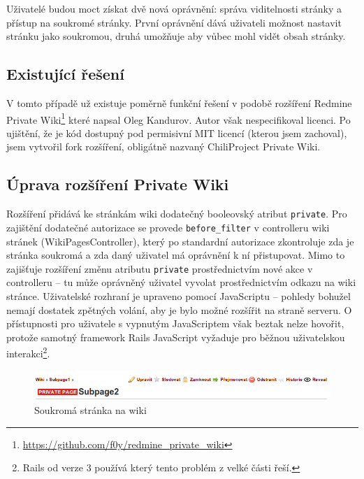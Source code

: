 \documentclass[thesis=B,czech]{FITthesis}[2012/05/02]
\begin{document}
Uživatelé budou moct získat dvě nová oprávnění: správa viditelnosti
stránky a přístup na soukromé stránky. První oprávnění dává uživateli
možnost nastavit stránku jako soukromou, druhá umožňuje aby vůbec mohl
vidět obsah stránky.

\subsection{Existující řešení}

V tomto případě už existuje poměrně funkční řešení v podobě rozšíření
Redmine Private Wiki\footnote{\url{https://github.com/f0y/redmine_private_wiki}}
které napsal Oleg Kandurov. Autor však nespecifikoval licenci. Po
ujištění, že je kód dostupný pod permisivní MIT licencí (kterou jsem
zachoval), jsem vytvořil \gls{fork} rozšíření, obligátně nazvaný
ChiliProject Private Wiki.

\subsection{Úprava rozšíření Private Wiki}

Rozšíření přidává ke stránkám wiki dodatečný booleovský atribut
\lstinline!private!. Pro zajištění dodatečné autorizace se provede
\lstinline!before_filter! v controlleru wiki stránek
(WikiPagesController), který po standardní autorizace zkontroluje zda je
stránka soukromá a zda daný uživatel má oprávnění k ní přistupovat. Mimo
to zajišťuje rozšíření změnu atributu \lstinline!private!
prostřednictvím nové akce v controlleru -- tu může oprávněný uživatel
vyvolat prostřednictvím odkazu na wiki stránce. Uživatelské rozhraní je
upraveno pomocí JavaScriptu -- pohledy bohužel nemají dostatek zpětných
volání, aby je bylo možné rozšířit na straně serveru. O přístupnosti pro
uživatele s vypnutým JavaScriptem však beztak nelze hovořit, protože
samotný framework Rails JavaScript vyžaduje pro běžnou uživatelskou
interakci\footnote{Rails od verze 3 používá 
  který tento problém z velké části řeší.}.

\begin{figure}[tbp]
\centering
\centerline{\includegraphics[width=1.2\textwidth]{wiki-gui1.png}}
\caption{Soukromá stránka na wiki}
\label{fig:GUIPrivateWiki}
\end{figure}
\end{document}
